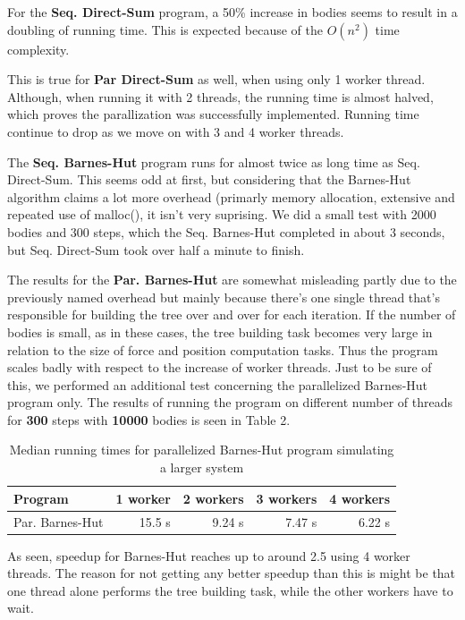 \documentclass[10pt,a4paper]{article}
\begin{document}
For the \textbf{Seq. Direct-Sum} program, a 50\% increase in bodies seems to result in a doubling of running time. This is expected because of the $O(n^2)$ time complexity. 

This is true for \textbf{Par Direct-Sum} as well, when using only 1 worker thread. Although, when running it with 2 threads, the running time is almost halved, which proves the parallization was successfully implemented. Running time continue to drop as we move on with 3 and 4 worker threads.

The \textbf{Seq. Barnes-Hut} program runs for almost twice as long time as Seq. Direct-Sum. This seems odd at first, but considering that the Barnes-Hut algorithm claims a lot more overhead (primarly memory allocation, extensive and repeated use of \textsf{malloc()}, it isn't very suprising. We did a small test with 2000 bodies and 300 steps, which the Seq. Barnes-Hut completed in about 3 seconds, but Seq. Direct-Sum took over half a minute to finish.

The results for the \textbf{Par. Barnes-Hut} are somewhat misleading partly due to the previously named overhead but mainly because there's one single thread that's responsible for building the tree over and over for each iteration. If the number of bodies is small, as in these cases, the tree building task becomes very large in relation to the size of force and position computation tasks. Thus the program scales badly with respect to the increase of worker threads. Just to be sure of this, we performed an additional test concerning the parallelized Barnes-Hut program only. The results of running the program on different number of threads for \textbf{300} steps with \textbf{10000} bodies is seen in Table 2.
\begin{table}[h!]
\centering
\begin{tabular}{|l|r|r|r|r|}
\hline
Program & 1 worker & 2 workers & 3 workers & 4 workers\\ \hline
Par. Barnes-Hut & 15.5 s & 9.24 s & 7.47 s & 6.22 s \\ \hline
\end{tabular}
\caption{Median running times for parallelized Barnes-Hut program simulating a larger system}
As seen, speedup for Barnes-Hut reaches up to around 2.5 using 4 worker threads. The reason for not getting any better speedup than this is might be that one thread alone performs the tree building task, while the other workers have to wait.
\end{table}
\end{document}
